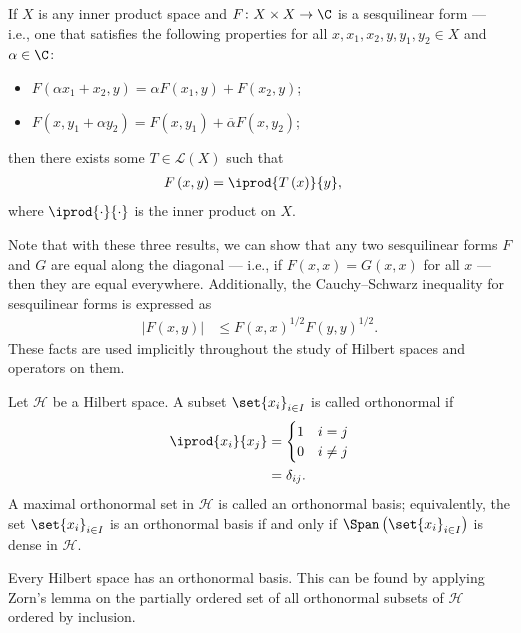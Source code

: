 \begin{lemma}
  If $X$ is any inner product space and $F\colon X\times X \rightarrow \C$ is a sesquilinear form --- i.e., one that satisfies the following properties for all $x,x_1,x_2,y,y_1,y_2\in X$ and $\alpha\in\C$:
  \begin{itemize}
    \item $F\left(\alpha x_1+x_2,y\right) = \alpha F\left(x_1,y\right) + F\left(x_2,y\right)$;
    \item $F\left(x,y_1 + \alpha y_2\right) = F\left(x,y_1\right) + \overline{\alpha}F\left(x,y_2\right)$;
  \end{itemize}
  then there exists some $T\in \mathcal{L}\left(X\right)$ such that
  \begin{align*}
    F\left(x,y\right) &= \iprod{T\left(x\right)}{y},
  \end{align*}
  where $ \iprod{\cdot}{\cdot} $ is the inner product on $X$.
\end{lemma}
Note that with these three results, we can show that any two sesquilinear forms $F$ and $G$ are equal along the diagonal --- i.e., if $F(x,x) = G(x,x)$ for all $x$ --- then they are equal everywhere. Additionally, the Cauchy--Schwarz inequality for sesquilinear forms is expressed as
\begin{align*}
  \left\vert F\left(x,y\right) \right\vert &\leq F\left(x,x\right)^{1/2}F\left(y,y\right)^{1/2}.
\end{align*}
These facts are used implicitly throughout the study of Hilbert spaces and operators on them.
\begin{definition}
  Let $\mathcal{H}$ be a Hilbert space. A subset $\set{x_i}_{i\in I}$ is called orthonormal if 
  \begin{align*}
    \iprod{x_i}{x_j} &= \begin{cases}
      1 & i=j\\
      0 & i\neq j
    \end{cases}\\
                     &= \delta_{ij}.
  \end{align*}
  A maximal orthonormal set in $\mathcal{H}$ is called an orthonormal basis; equivalently, the set $\set{x_i}_{i\in I}$ is an orthonormal basis if and only if $\Span\left(\set{x_i}_{i\in I}\right)$ is dense in $\mathcal{H}$.
\end{definition}
\begin{remark}
  Every Hilbert space has an orthonormal basis. This can be found by applying Zorn's lemma on the partially ordered set of all orthonormal subsets of $\mathcal{H}$ ordered by inclusion.
\end{remark}

